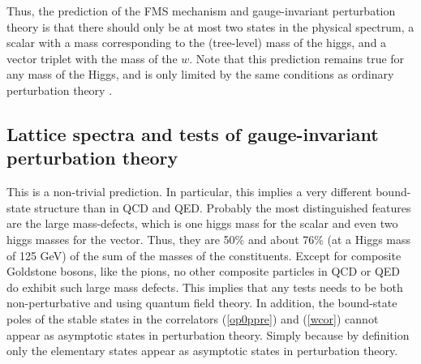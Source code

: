 \documentclass[final,twoside,12pt]{article}
\newcommand*{\pref}[1]{(\ref{#1})}
\newcommand*{\1}{1\!\!\!\bot}
\begin{document}
Thus, the prediction of the FMS mechanism and gauge-invariant perturbation theory is that there should only be at most two states in the physical spectrum, a scalar with a mass corresponding to the (tree-level) mass of the higgs, and a vector triplet with the mass of the $w$. Note that this prediction remains true for any mass of the Higgs, and is only limited by the same conditions as ordinary perturbation theory \cite{Bohm:2001yx}.

\subsection{Lattice spectra and tests of gauge-invariant perturbation theory}\label{ss:latgipt}

This is a non-trivial prediction. In particular, this implies a very different bound-state structure than in QCD and QED. Probably the most distinguished features are the large mass-defects, which is one higgs mass for the scalar and even two higgs masses for the vector. Thus, they are 50\% and about 76\% (at a Higgs mass of 125 GeV) of the sum of the masses of the constituents. Except for composite Goldstone bosons, like the pions, no other composite particles in QCD or QED do exhibit such large mass defects. This implies that any tests needs to be both non-perturbative and using quantum field theory. In addition, the bound-state poles of the stable states in the correlators \pref{op0ppre} and \pref{wcor} cannot appear as asymptotic states in perturbation theory. Simply because by definition only the elementary states appear as asymptotic states in perturbation theory.
\end{document}
